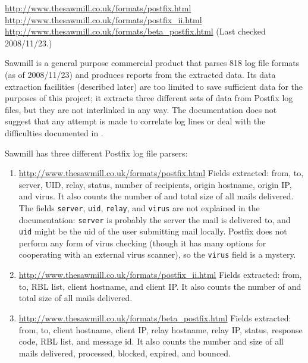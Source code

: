\noindent{}\url{http://www.thesawmill.co.uk/formats/postfix.html}
\newline{} \url{http://www.thesawmill.co.uk/formats/postfix_ii.html}
\newline{} \url{http://www.thesawmill.co.uk/formats/beta_postfix.html}
\newline{} (Last checked 2008/11/23.)

Sawmill is a general purpose commercial product that parses 818 log file
formats (as of 2008/11/23) and produces reports from the extracted data.
Its data extraction facilities (described later) are too limited to save
sufficient data for the purposes of this project; it extracts three
different sets of data from Postfix log files, but they are not interlinked
in any way.  The documentation does not suggest that any attempt is made to
correlate log lines or deal with the difficulties documented in
.

Sawmill has three different Postfix log file parsers:

\begin{enumerate}

    \item \url{http://www.thesawmill.co.uk/formats/postfix.html} \newline{}
        Fields extracted: from, to, server, UID, relay, status, number of
        recipients, origin hostname, origin \gls{IP}, and virus.  It also
        counts the number of and total size of all mails delivered.  The
        fields \texttt{server}, \texttt{uid}, \texttt{relay}, and
        \texttt{virus} are not explained in the documentation:
        \texttt{server} is probably the server the mail is delivered to,
        and \texttt{uid} might be the uid of the user submitting mail
        locally.  Postfix does not perform any form of virus checking
        (though it has many options for cooperating with an external virus
        scanner), so the \texttt{virus} field is a mystery.

    \item \url{http://www.thesawmill.co.uk/formats/postfix_ii.html}
        \newline{} Fields extracted: from, to, RBL list, client hostname,
        and client \gls{IP}\@.  It also counts the number of and total size
        of all mails delivered.  

    \item \url{http://www.thesawmill.co.uk/formats/beta_postfix.html}
        \newline{} Fields extracted: from, to, client hostname, client
        \gls{IP}, relay hostname, relay \gls{IP}, status, response code,
        RBL list, and message id.  It also counts the number and size of
        all mails delivered, processed, blocked, expired, and bounced.

\end{enumerate}

